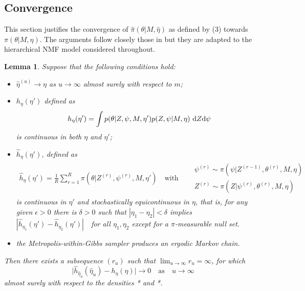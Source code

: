 \documentclass[11pt]{amsart}
\newtheorem{lemma}{Lemma}
\theoremstyle{definition}
\theoremstyle{remark}
\begin{document}
\subsection{Convergence}
This section justifies the convergence of $\widehat\pi(\theta|M,
\hat\eta)$ as defined by (3) towards $\pi(\theta|M, \eta)$. The
arguments follow closely those in \cite{C01} but they are
adapted to the hierarchical NMF model considered throughout. 
\begin{lemma}\label{lem:technical} Suppose that the following
  conditions hold:
\begin{itemize}
 \item[(i)] $\hat\eta^{(u)} \to \eta$ as $u \to \infty$ almost
   surely with respect to $m$; 
 \item[(ii)] $h_\eta(\eta')$ defined as
\[
  h_{\eta}(\eta') 
   = 
 \int p(\theta|Z, \psi, M, \eta')p(Z, \psi|M, \eta)\
 \textup{d} Z \textup{d} \psi
\]
is continuous in both $\eta$ and $\eta'$;
\item[(iii)] $\widehat h_\eta(\eta')$, defined as
\begin{align*}
  \widehat h_\eta(\eta') 
  = 
 \frac{1}{R}\sum_{r=1}^R \pi(\theta|Z^{(r)}, \psi^{(r)}, M, \eta')
    \quad \text{with}\quad 
   \begin{aligned}
      &\psi^{(r)} \sim \pi(\psi|Z^{(r-1)}, \theta^{(r)}, M, \eta)\\
      &Z^{(r)} \sim \pi(Z| \psi^{(r)}, \theta^{(r)}, M, \eta) 
   \end{aligned}
\end{align*}
 is continuous in $\eta'$ and stochastically equicontinuous in $\eta$,
that is, for any given $\epsilon > 0$ there is $\delta>0$ such that
$|\eta_1 - \eta_2| < \delta$ implies $|\widehat h_{\eta_1}(\eta') -
\widehat h_{\eta_2}(\eta')|$\ \ for all $\eta_1, \eta_2$ except for a
$\pi$-measurable null set.
 \item[(iv)] the Metropolis-within-Gibbs sampler produces an ergodic
   Markov chain. 
\end{itemize}
Then there exists a subsequence $(r_u)$ such that $\lim_{u\to\infty}
r_u  = \infty$, for which
\[
   \big|\widehat h_{\hat\eta_u}(\hat\eta_u) - h_\eta(\eta)\big| \to 0 
  \quad\text{as}\quad 
   u \to \infty
\]
almost surely with respect to the densities * and *.
\end{lemma} 
\end{document}
